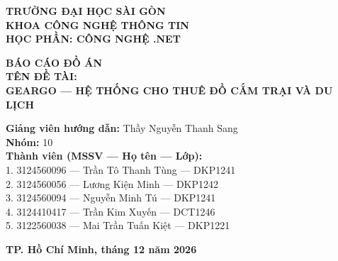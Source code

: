 \begin{titlepage}
\begin{center}

{\large\textbf{TRƯỜNG ĐẠI HỌC SÀI GÒN}}\\[0.3cm]
{\large\textbf{KHOA CÔNG NGHỆ THÔNG TIN}}\\[0.3cm]
{\large\textbf{HỌC PHẦN: CÔNG NGHỆ .NET}}\\[2cm]


\vspace{1.5cm}

{\LARGE\textbf{BÁO CÁO ĐỒ ÁN}}\\[1cm]

{\Large\textbf{TÊN ĐỀ TÀI:}}\\[0.5cm]

{\LARGE\textbf{GEARGO --- HỆ THỐNG CHO THUÊ ĐỒ CẮM TRẠI VÀ DU LỊCH}}\\[0.2cm]

\begin{flushleft}
\hspace{2cm}\textbf{Giảng viên hướng dẫn:}\hspace{0.5cm} Thầy Nguyễn Thanh Sang\\[0.3cm]
\hspace{2cm}\textbf{Nhóm:}\hspace{0.5cm} 10\\[0.3cm]
\hspace{2cm}\textbf{Thành viên (MSSV --- Họ tên --- Lớp):}\\[0.3cm]

\hspace{2.5cm}1. 3124560096 --- Trần Tô Thanh Tùng --- DKP1241\\[0.2cm]
\hspace{2.5cm}2. 3124560056 --- Lương Kiện Minh --- DKP1242\\[0.2cm]
\hspace{2.5cm}3. 3124560094 --- Nguyễn Minh Tú --- DKP1241\\[0.2cm]
\hspace{2.5cm}4. 3124410417 --- Trần Kim Xuyến --- DCT1246\\[0.2cm]
\hspace{2.5cm}5. 3122560038 --- Mai Trần Tuấn Kiệt --- DKP1221\\[0.2cm]
\end{flushleft}

\vfill

{\large\textbf{TP. Hồ Chí Minh, tháng 12 năm 2026}}

\end{center}
\end{titlepage}
